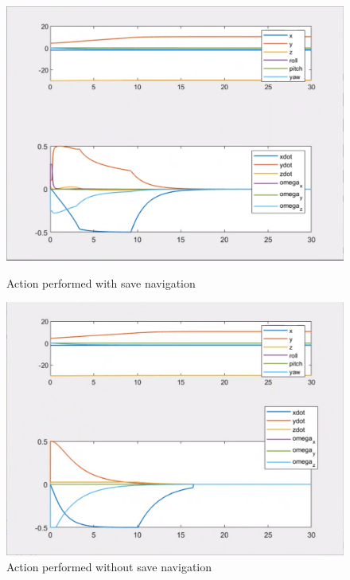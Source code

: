 \documentclass{article}
\begin{document}

\begin{figure}[htpb] 
\begin{minipage}{0.40\textwidth}  
\includegraphics[width=\textwidth]{522_wout_MP.png}
\caption{Action performed with save navigation}\label{522_n1} 
\end{minipage}  
\hspace{0.2\textwidth} 
\begin{minipage}{0.40\textwidth}  
\includegraphics[width=\textwidth]{522_w_MP.png}
\caption{Action performed without save navigation}\label{522_n2} 
\end{minipage} 
\end{figure}
\clearpage
\end{document}

